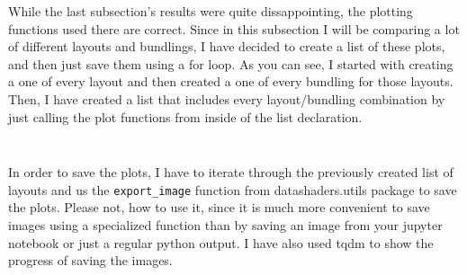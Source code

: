 \documentclass[12pt, a4paper]{article}
\begin{document}
While the last subsection's results were quite dissappointing, the plotting functions used there are correct. Since in this subsection I will be comparing a lot of different layouts and bundlings, I have decided to create a list of these plots, and then just save them using a for loop. As you can see, I started with creating a one of every layout and then created a one of every bundling for those layouts. Then, I have created a list that includes every layout/bundling combination by just calling the plot functions from inside of the list declaration.

\bgroup
  \inputminted[linenos, breaklines=true, fontsize=\scriptsize]{python}{src/youtube/datashader/simple/2a_layouts.py}
  \label{listing:youtube_lgr_2a}
\egroup

\bgroup
  \inputminted[linenos, breaklines=true, fontsize=\scriptsize]{python}{src/youtube/datashader/simple/2b_showcase.py}
  \label{listing:youtube_lgr_2b}
\egroup


In order to save the plots, I have to iterate through the previously created list of layouts and us the \texttt{export\_image} function from datashaders.utils package to save the plots. Please not, how to use it, since it is much more convenient to save images using a specialized function than by saving an image from your jupyter notebook or just a regular python output. I have also used tqdm to show the progress of saving the images.

\bgroup
  \inputminted[linenos, breaklines=true, fontsize=\scriptsize, firstnumber=last]{python}{src/youtube/datashader/simple/2c_saving.py}
  \label{listing:youtube_lgr_2c}
\egroup

\end{document}
